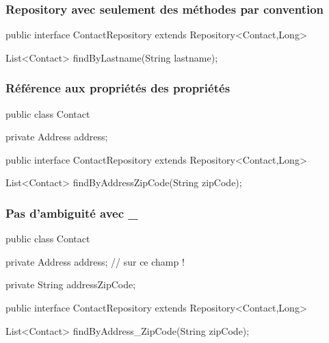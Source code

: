 \begin{frame}[fragile]
 \frametitle{Repository avec seulement des méthodes par convention}
 \begin{javacode}
public interface ContactRepository extends Repository<Contact,Long> {

  List<Contact> findByLastname(String lastname);

}  
 \end{javacode}
\end{frame}

\begin{frame}[fragile]
 \frametitle{Référence aux propriétés des propriétés}
 \begin{javacode}
public class Contact {
	
  private Address address;
 
}
 
public interface ContactRepository extends Repository<Contact,Long> {

  List<Contact> findByAddressZipCode(String zipCode);

}  
 \end{javacode}
\end{frame}

\begin{frame}[fragile]
 \frametitle{Pas d'ambiguité avec \_}
 \begin{javacode}
public class Contact {
	
  private Address address; // sur ce champ !
  
  private String addressZipCode;
 
}
 
public interface ContactRepository extends Repository<Contact,Long> {

  List<Contact> findByAddress_ZipCode(String zipCode);

}  
 \end{javacode}
\end{frame}